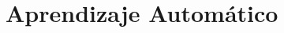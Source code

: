 \documentclass[10pt,center]{beamer}
\begin{document}
\begin{frame}
\begin{figure}[h]
\begin{center}
      
    \end{center}
  \end{figure}  
\end{frame}	
  
  
\section{Aprendizaje Automático}
\end{document}
